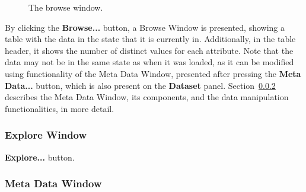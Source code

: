 \documentclass{article}
\begin{document}
\begin{figure}
\begin{center}
\centering
{}
\caption{The browse window.}
\end{center}
\label{fig:browsewindow}
\end{figure}

By clicking the {\bf Browse...} button, a Browse Window is presented, showing a table with the data in the state that it is currently in.
Additionally, in the table header, it shows the number of distinct values for each attribute.
Note that the data may not be in the same state as when it was loaded, as it can be modified using functionality of the Meta Data Window, presented after pressing the {\bf Meta Data...} button, which is also present on the {\bf Dataset} panel.
Section~\ref{sec:metadata} describes the Meta Data Window, its components, and the data manipulation functionalities, in more detail.

\subsubsection{Explore Window}

{\bf Explore...} button.

\subsubsection{Meta Data Window}
\label{sec:metadata}
\end{document}
